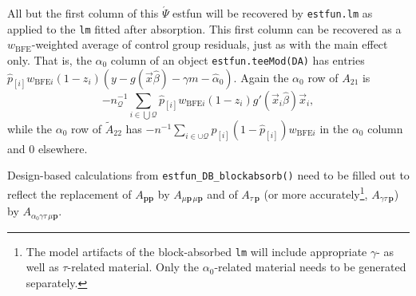 \documentclass{article}
\begin{document}
All but the first column of this $\acute{\Psi}$ estfun will be
recovered by \texttt{estfun.lm} as applied to the \texttt{lm} fitted
after absorption.  This first column can be recovered as a
$w_{\text{BFE}}$-weighted average of control group residuals, just as
with the main effect only. That is, the 
$\alpha_{0}$ column of an object \texttt{estfun.teeMod(DA)} has entries
$\hat{p}_{[i]}w_{\text{BFE}i}(1-z_{i})(y - g(\vec{x}\hat{\beta})
-{\gamma}m -
\hat{\alpha}_{0})$. Again the $\alpha_{0}$ row of $A_{21}$ is 
\begin{equation*}
  -n_{\mathcal{Q}}^{-1}\sum_{i\in \bigcup\mathcal{Q} }
  \hat{p}_{[i]}w_{\text{BFE}i} (1-z_{i})g'(\vec{x}_{i}\hat{\beta}) \vec{x}_{i},
\end{equation*}
while the
$\alpha_{0}$ row of $\tilde{A}_{22}$ has $-n^{-1}\sum_{i \in \cup \mathcal{Q}}
p_{[i]}(1-\hat{p}_{[i]})w_{\text{BFE}i}$ in the
$\alpha_{0}$ column and 0 elsewhere.

Design-based calculations from
\texttt{estfun\_DB\_blockabsorb()} need to be filled out to reflect
the replacement of $A_{\mathbf{p}\mathbf{p}}$ by $A_{\mu \mathbf{p}\,
  \mu\mathbf{p}}$ and of $A_{\tau\,\mathbf{p}}$ (or more accurately\footnote{%
The model artifacts of the block-absorbed \texttt{lm} will include
appropriate $\gamma$- as well as $\tau$-related
material. Only the $\alpha_{0}$-related material needs to be generated
separately.
}, $A_{\gamma\tau\,\mathbf{p}}$) by $A_{\alpha_{0}\gamma \tau\, \mu\mathbf{p}}$.
\end{document}
